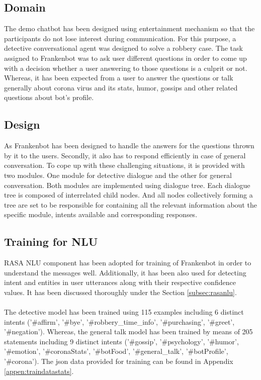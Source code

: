 \subsection{Domain}
The demo chatbot has been designed using entertainment mechanism so that the participants do not lose interest during communication. For this purpose, a detective conversational agent was designed to solve a robbery case. The task assigned to Frankenbot was to ask user different questions in order to come up with a decision whether a user answering to those questions is a culprit or not. Whereas, it has been expected from a user to answer the questions or talk generally about corona virus and its stats, humor, gossips and other related questions about bot's profile.

\subsection{Design}
As Frankenbot has been designed to handle the answers for the questions thrown by it to the users. Secondly, it also has to respond efficiently in case of general conversation. To cope up with these challenging situations, it is provided with two modules. One module for detective dialogue and the other for general conversation. Both modules are implemented using dialogue tree. Each dialogue tree is composed of interrelated child nodes. And all nodes collectively forming a tree are set to be responsible for containing all the relevant information about the specific module, intents available and corresponding responses. 

\subsection{Training for NLU \label{sec:expchatbot}}
RASA NLU component has been adopted for training of Frankenbot in order to understand the messages well. Additionally, it has been also used for detecting intent and entities in user utterances along with their respective confidence values.  It has been discussed thoroughly under the Section \ref{subsec:rasanlu}.  
\\~\\
The detective model has been trained using 115 examples including 6 distinct intents ('\#affirm', '\#bye', '\#robbery\_time\_info', '\#purchasing', '\#greet', '\#negation'). Whereas, the general talk model has been trained by means of 205 statements including 9 distinct intents ('\#gossip', '\#psychology', '\#humor', '\#emotion', '\#coronaStats', '\#botFood', '\#general\_talk', '\#botProfile', '\#corona'). The json data provided for training can be found in Appendix \ref{appen:traindatastats}.

